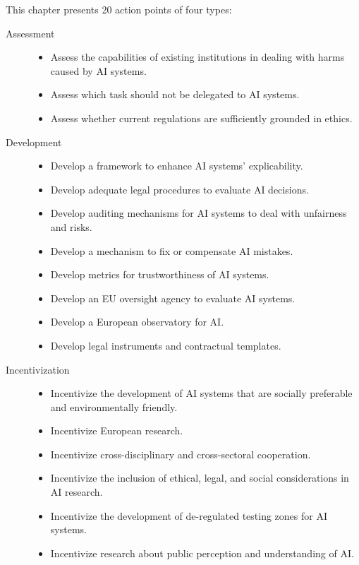 This chapter presents 20 action points of four types:
\begin{description}
    \item[Assessment] \phantom{}
        \begin{itemize}
            \item Assess the capabilities of existing institutions in dealing with harms caused by AI systems.
            \item Assess which task should not be delegated to AI systems.
            \item Assess whether current regulations are sufficiently grounded in ethics.
        \end{itemize}

    \item[Development] \phantom{}
        \begin{itemize}
            \item Develop a framework to enhance AI systems' explicability.
            \item Develop adequate legal procedures to evaluate AI decisions.
            \item Develop auditing mechanisms for AI systems to deal with unfairness and risks.
            \item Develop a mechanism to fix or compensate AI mistakes.
            \item Develop metrics for trustworthiness of AI systems.
            \item Develop an EU oversight agency to evaluate AI systems.
            \item Develop a European observatory for AI.
            \item Develop legal instruments and contractual templates.
        \end{itemize}
        
    \item[Incentivization] \phantom{}
        \begin{itemize}
            \item Incentivize the development of AI systems that are socially preferable and environmentally friendly.
            \item Incentivize European research.
            \item Incentivize cross-disciplinary and cross-sectoral cooperation.
            \item Incentivize the inclusion of ethical, legal, and social considerations in AI research.
            \item Incentivize the development of de-regulated testing zones for AI systems.
            \item Incentivize research about public perception and understanding of AI.
        \end{itemize}
    

\end{description}
